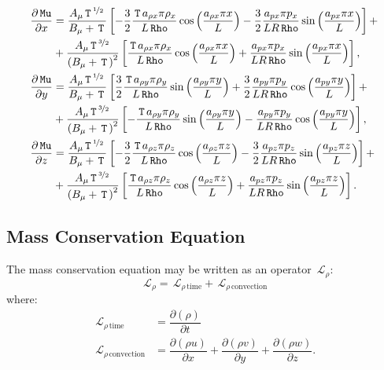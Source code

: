 \documentclass[10pt]{article}
\newcommand{\Diff}[2] {\dfrac{\partial( #1)}{\partial #2}}
\newcommand{\diff}[2] {\dfrac{\partial #1}{\partial #2}}
\newcommand{\Rho}{\,\mathtt{Rho}}
\newcommand{\Lo}{\,\mathcal{L}}
\newcommand{\Mu}{\,\mathtt{Mu}}
\newcommand{\T}{\,\mathtt{T}\,}
\newcommand{\DMuDx}{\diff{\Mu}{x}}
\newcommand{\DMuDy}{\diff{\Mu}{y}}
\newcommand{\DMuDz}{\diff{\Mu}{z}}
\begin{document}
\begin{equation}\label{eq:aux_02}
 \begin{split}
\DMuDx&=
\frac{A_{\mu} \T^{\nicefrac{1}{2} \, } }{B_{\mu} + \T}\left[-  \frac{3}{2} \frac{    \T a_{\rho x} \pi \rho_{x} }{L \Rho}\cos\left(\frac{a_{\rho x} \pi x}{L}\right) -  \frac{3}{2} \frac{   a_{px} \pi  p_{x} }{L R \Rho}\sin\left(\frac{a_{px} \pi  x}{L}\right)\right] +\\
& + \frac{A_{\mu} \T^{\nicefrac{3}{2} \, } }{\left(B_{\mu} + \T\right)^{2}}\left[\frac{ \T a_{\rho x} \pi \rho_{x} }{L \Rho}\cos\left(\frac{a_{\rho x} \pi x}{L}\right) + \frac{a_{px} \pi  p_{x} }{L R \Rho}\sin\left(\frac{a_{px} \pi  x}{L}\right)\right],\\
%
 \DMuDy&=
\frac{A_{\mu} \T^{\nicefrac{1}{2} \, } }{B_{\mu} + \T}\left[ \frac{3}{2} \frac{    \T a_{\rho y} \pi \rho_{y} }{L \Rho}\sin\left(\frac{a_{\rho y} \pi y}{L}\right) +  \frac{3}{2} \frac{   a_{py} \pi  p_{y}}{L R \Rho} \cos\left(\frac{a_{py} \pi  y}{L}\right)\right] +\\
& + \frac{A_{\mu} \T^{\nicefrac{3}{2} \, } }{\left(B_{\mu} + \T\right)^{2}}\left[- \frac{ \T a_{\rho y} \pi \rho_{y} }{L \Rho}\sin\left(\frac{a_{\rho y} \pi y}{L}\right) - \frac{a_{py} \pi  p_{y} }{L R \Rho}\cos\left(\frac{a_{py} \pi  y}{L}\right)\right],\\
%
 \DMuDz&=
\frac{A_{\mu} \T^{\nicefrac{1}{2} \, } }{B_{\mu} + \T}\left[-  \frac{3}{2} \frac{    \T a_{\rho z} \pi \rho_{z} }{L \Rho}\cos\left(\frac{a_{\rho z} \pi z}{L}\right) -  \frac{3}{2} \frac{   a_{pz} \pi  p_{z}}{L R \Rho} \sin\left(\frac{a_{pz} \pi  z}{L}\right)\right] +\\
& + \frac{A_{\mu} \T^{\nicefrac{3}{2} \, } }{\left(B_{\mu} + \T\right)^{2}}\left[\frac{ \T a_{\rho z} \pi \rho_{z} }{L \Rho}\cos\left(\frac{a_{\rho z} \pi z}{L}\right) + \frac{a_{pz} \pi  p_{z} }{L R \Rho}\sin\left(\frac{a_{pz} \pi  z}{L}\right)\right].
 \end{split}
\end{equation}


\subsection{Mass Conservation Equation}

The mass conservation equation may be written as an operator $\Lo_\rho$:
$$ \Lo_{\rho} = \Lo_{\rho \, \text{time}}+\Lo_{\rho \, \text{convection}}$$
where:
\begin{equation}
\begin{split}\label{eq:rho_operators}
\Lo_{\rho \, \text{time}}&=\Diff{\rho}{t} \\
\Lo_{\rho \, \text{convection}}&=\Diff{\rho u}{x}+\Diff{\rho v}{y} + \Diff{\rho w}{z}.
\end{split}
 \end{equation}
\end{document}
